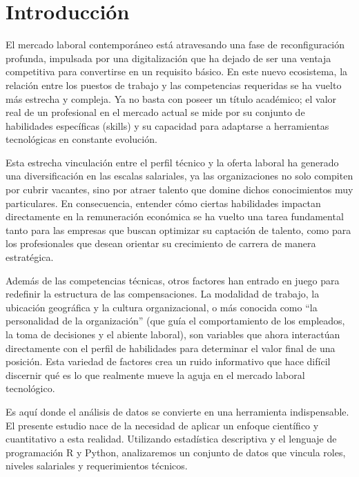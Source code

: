 \documentclass[oneside,11pt]{Latex/Classes/PhDthesisPSnPDF}
\begin{document}
\mainmatter
\def\baselinestretch{1.5}

\newpage

\chapter*{Introducción}

El mercado laboral contemporáneo está atravesando una fase de
reconfiguración profunda, impulsada por una digitalización que ha dejado
de ser una ventaja competitiva para convertirse en un requisito básico.
En este nuevo ecosistema, la relación entre los puestos de trabajo y las
competencias requeridas se ha vuelto más estrecha y compleja. Ya no
basta con poseer un título académico; el valor real de un profesional en
el mercado actual se mide por su conjunto de habilidades específicas
(skills) y su capacidad para adaptarse a herramientas tecnológicas en
constante evolución.

Esta estrecha vinculación entre el perfil técnico y la oferta laboral ha
generado una diversificación en las escalas salariales, ya las
organizaciones no solo compiten por cubrir vacantes, sino por atraer
talento que domine dichos conocimientos muy particulares. En
consecuencia, entender cómo ciertas habilidades impactan directamente en
la remuneración económica se ha vuelto una tarea fundamental tanto para
las empresas que buscan optimizar su captación de talento, como para los
profesionales que desean orientar su crecimiento de carrera de manera
estratégica.

Además de las competencias técnicas, otros factores han entrado en juego
para redefinir la estructura de las compensaciones. La modalidad de
trabajo, la ubicación geográfica y la cultura organizacional, o más
conocida como ``la personalidad de la organización'' (que guía el
comportamiento de los empleados, la toma de decisiones y el abiente
laboral), son variables que ahora interactúan directamente con el perfil
de habilidades para determinar el valor final de una posición. Esta
variedad de factores crea un ruido informativo que hace difícil
discernir qué es lo que realmente mueve la aguja en el mercado laboral
tecnológico.

Es aquí donde el análisis de datos se convierte en una herramienta
indispensable. El presente estudio nace de la necesidad de aplicar un
enfoque científico y cuantitativo a esta realidad. Utilizando
estadística descriptiva y el lenguaje de programación R y Python,
analizaremos un conjunto de datos que vincula roles, niveles salariales
y requerimientos técnicos.
\end{document}
